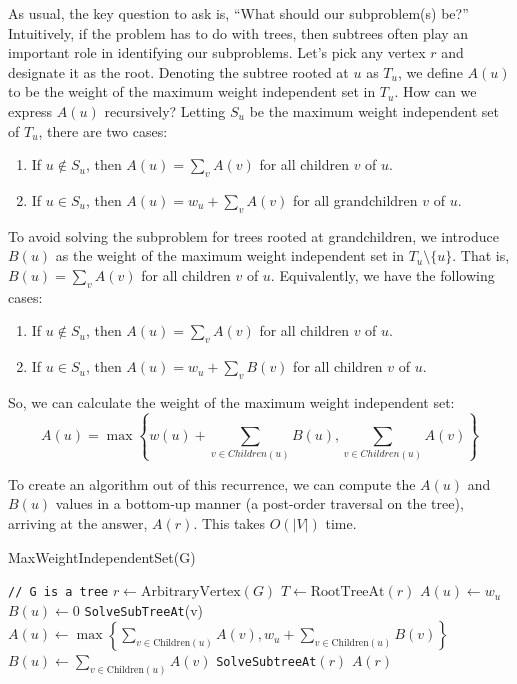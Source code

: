 \documentclass [12pt]{article}
\theoremstyle{definition}
\begin{document}
As usual, the key question to ask is, ``What should our subproblem(s) be?'' Intuitively, if the problem has to do with trees, then subtrees often play an important role in identifying our subproblems. Let's pick any vertex $r$ and designate it as the root. Denoting the subtree rooted at $u$ as $T_u$, we define $A(u)$ to be the weight of the maximum weight independent set in $T_u$. How can we express $A(u)$ recursively? Letting $S_u$ be the maximum weight independent set of $T_u$, there are two cases:

\begin{enumerate}
    \item If $u \notin S_u$, then $A(u) = \sum_{v} A(v )$ for all children $v$ of $u$.
    \item If $u \in S_u$, then $A(u) = w_u + \sum_{v} A(v )$ for all grandchildren $v$ of $u$. 
\end{enumerate}

To avoid solving the subproblem for trees rooted at grandchildren, we introduce $B(u)$ as the weight of the maximum weight independent set in $T_u \setminus \{u\}$. That is, $B(u) = \sum_{v} A(v )$ for all children $v$ of $u$. Equivalently, we have the following cases: 

\begin{enumerate}
    \item If $u \notin S_u$, then $A(u) = \sum_{v} A(v )$ for all children $v$ of $u$.
    \item If $u \in S_u$, then $A(u) = w_u + \sum_{v} B(v )$ for all children $v$ of $u$. 
\end{enumerate}

So, we can calculate the weight of the maximum weight independent set:
$$
A(u) = \max\left\{w(u) + \sum_{v \in Children(u)} B(u), \sum_{v \in Children(u)} A(v)  \right\}
$$

To create an algorithm out of this recurrence, we can compute the $A(u)$ and $B(u)$ values in a bottom-up manner (a post-order traversal on the tree), arriving at the answer, $A(r)$. This
takes $O(|V|)$ time.

\begin{algorithm}
\caption{MaxWeightIndependentSet(G)}
\label{alg:MaxWeightIndependentSet}
\begin{algorithmic}
\State \texttt{// G is a tree}
\State $r \gets \text{ArbitraryVertex}(G)$
\State $T \gets \text{RootTreeAt}(r)$
        \State $A(u) \gets w_u$
        \State $B(u) \gets 0$
    \Else
            \State \texttt{SolveSubTreeAt}(v)
        \EndFor
        \State $A(u) \gets \max\left\{\sum_{v \in \text{Children}(u)} A(v), w_u + \sum_{v \in \text{Children}(u)} B(v) \right\}$
        \State $B(u) \gets \sum_{v \in \text{Children}(u)} A(v)$
    \EndIf
\EndProcedure
\texttt{SolveSubtreeAt}$(r)$
\Return $A(r)$
\end{algorithmic}
\end{algorithm}
\end{document}
